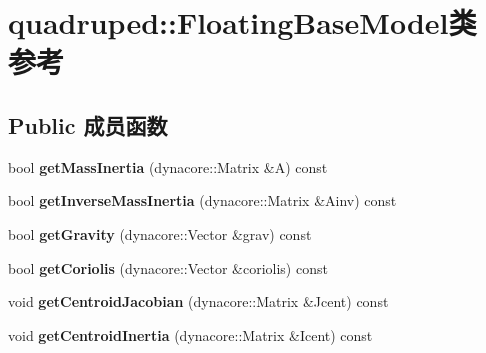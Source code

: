 \hypertarget{classquadruped_1_1FloatingBaseModel}{}\section{quadruped\+:\+:Floating\+Base\+Model类 参考}
\label{classquadruped_1_1FloatingBaseModel}
\subsection*{Public 成员函数}
\begin{DoxyCompactItemize}
\item 
\mbox{\label{classquadruped_1_1FloatingBaseModel_a5f5f04261e961fae57f84aaf80f65f4f}} 
bool {\bfseries get\+Mass\+Inertia} (dynacore\+::\+Matrix \&A) const
\item 
\mbox{\label{classquadruped_1_1FloatingBaseModel_a7955bced1fbfb11965de500d31900d3d}} 
bool {\bfseries get\+Inverse\+Mass\+Inertia} (dynacore\+::\+Matrix \&Ainv) const
\item 
\mbox{\label{classquadruped_1_1FloatingBaseModel_a8f337459898a613548efb4af536f64e1}} 
bool {\bfseries get\+Gravity} (dynacore\+::\+Vector \&grav) const
\item 
\mbox{\label{classquadruped_1_1FloatingBaseModel_a5345ee06da415df56a17623a100addfe}} 
bool {\bfseries get\+Coriolis} (dynacore\+::\+Vector \&coriolis) const
\item 
\mbox{\label{classquadruped_1_1FloatingBaseModel_afb96803e722a8d0565f1a43327935b27}} 
void {\bfseries get\+Centroid\+Jacobian} (dynacore\+::\+Matrix \&Jcent) const
\item 
\mbox{\label{classquadruped_1_1FloatingBaseModel_a16dcc8e6ed6984a0996d2d7648b0a351}} 
void {\bfseries get\+Centroid\+Inertia} (dynacore\+::\+Matrix \&Icent) const
\item 
\mbox{\label{classquadruped_1_1FloatingBaseModel_aa38322065e6fa0c7381b3a82874854e0}} 

\end{DoxyCompactItemize}
